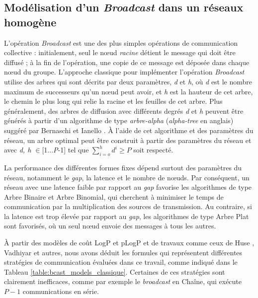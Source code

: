 \subsection{\label{sec:Broadcast}Modélisation d'un \textit{Broadcast} dans un réseaux homogène}

L'opération \emph{Broadcast} est une des plus simples opérations de
communication collective : initialement, seul le n{\oe}ud \emph{racine}
détient le message qui doit être diffusé ; à la fin de l'opération,
une copie de ce message est déposée dans chaque n{\oe}ud du groupe.
L'approche classique pour implémenter l'opération \emph{Broadcast} utilise
des arbres qui sont décrits par deux paramètres, \emph{d} et \emph{h},
où \emph{d} est le nombre maximum de successeurs qu'un n{\oe}ud peut
avoir, et \emph{h} est la hauteur de cet arbre, le chemin le plus
long qui relie la racine et les feuilles de cet arbre. Plus généralement,
des arbres de diffusion avec différents degrés \emph{d} et \emph{h}
peuvent être générés à partir d'un algorithme de type \emph{arbre-alpha}
(\emph{alpha-tree} en anglais) suggéré par Bernaschi et Ianello \cite{Bernaschi98}.
À l'aide de cet algorithme et des paramètres du réseau, un arbre optimal
peut être construit à partir des paramètres du réseau et avec \emph{d,
	h $\in$}{[}1...\emph{P}-1] tel que $\sum_{i=o}^{h}d^{i}\geq P$ soit
respecté. %

La performance des différentes formes fixes dépend surtout des paramètres
du réseau, notamment le \emph{gap}, la latence et le nombre de n{\oe}uds.
Par conséquent, un réseau avec une latence faible par rapport au \emph{gap}
favorise les algorithmes de type Arbre Binaire et Arbre Binomial,
qui cherchent à minimiser le temps de communication par la multiplication
des sources de transmission. Au contraire, si la latence est trop
élevée par rapport au \emph{gap}, les algorithmes de type Arbre Plat
sont favorisés, où un seul n{\oe}ud envoie des messages à tous les
autres. 


À partir des modèles de coût LogP \cite{Culler96} et pLogP \cite{Kielmann01}
et de travaux comme ceux de Huse \cite{Huse99}, Vadhiyar \cite{Vadhiyar00}
et autres, nous avons déduit les formules qui représentent différentes
stratégies de communication évaluées dans ce travail, comme indiqué
dans le Tableau \ref{table:bcast_models_classique}. Certaines de
ces stratégies sont clairement inefficaces, comme par exemple le \textit{broadcast}
en Chaîne, qui exécute $P-1$ communications en série. 

